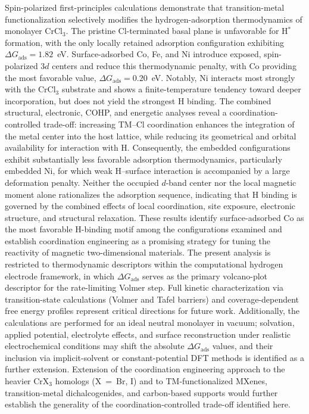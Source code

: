 \documentclass[journal=jacsat,manuscript=article]{achemso}
\begin{document}
Spin-polarized first-principles calculations demonstrate that transition-metal functionalization selectively modifies the hydrogen-adsorption thermodynamics of monolayer CrCl$_3$. The pristine Cl-terminated basal plane is unfavorable for H$^*$ formation, with the only locally retained adsorption configuration exhibiting $\Delta G_{\mathrm{ads}}=1.82$~eV. Surface-adsorbed Co, Fe, and Ni introduce exposed, spin-polarized $3d$ centers and reduce this thermodynamic penalty, with Co providing the most favorable value, $\Delta G_{\mathrm{ads}}=0.20$~eV. Notably, Ni interacts most strongly with the CrCl$_3$ substrate and shows a finite-temperature tendency toward deeper incorporation, but does not yield the strongest H binding. The combined structural, electronic, COHP, and energetic analyses reveal a coordination-controlled trade-off: increasing TM--Cl coordination enhances the integration of the metal center into the host lattice, while reducing its geometrical and orbital availability for interaction with H. Consequently, the embedded configurations exhibit substantially less favorable adsorption thermodynamics, particularly embedded Ni, for which weak H--surface interaction is accompanied by a large deformation penalty. Neither the occupied $d$-band center nor the local magnetic moment alone rationalizes the adsorption sequence, indicating that H binding is governed by the combined effects of local coordination, site exposure, electronic structure, and structural relaxation. These results identify surface-adsorbed Co as the most favorable H-binding motif among the configurations examined and establish coordination engineering as a promising strategy for tuning the reactivity of magnetic two-dimensional materials. The present analysis is restricted to thermodynamic descriptors within the computational hydrogen electrode framework, in which $\Delta G_{\mathrm{ads}}$ serves as the primary volcano-plot descriptor for the rate-limiting Volmer step. Full kinetic characterization via transition-state calculations (Volmer and Tafel barriers) and coverage-dependent free energy profiles represent critical directions for future work. Additionally, the calculations are performed for an ideal neutral monolayer in vacuum; solvation, applied potential, electrolyte effects, and surface reconstruction under realistic electrochemical conditions may shift the absolute $\Delta G_{\mathrm{ads}}$ values, and their inclusion via implicit-solvent or constant-potential DFT methods is identified as a further extension. Extension of the coordination engineering approach to the heavier CrX$_3$ homologs (X~=~Br, I) and to TM-functionalized MXenes, transition-metal dichalcogenides, and carbon-based supports would further establish the generality of the coordination-controlled trade-off identified here.
\end{document}
